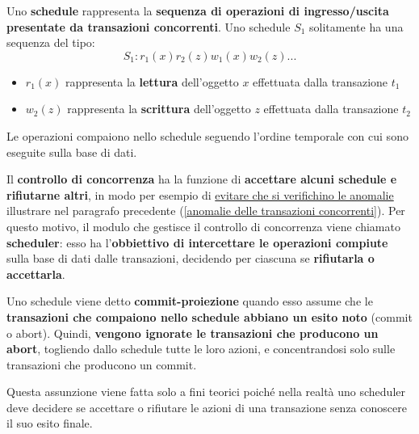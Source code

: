 \documentclass[a4paper]{article}
\begin{document}
	Uno \textcolor{Red3}{\textbf{schedule}} rappresenta la \textbf{sequenza di operazioni di ingresso/uscita presentate da transazioni concorrenti}. Uno schedule $S_{1}$ solitamente ha una sequenza del tipo:
	\begin{equation*}
		S_{1} : r_{1}\left(x\right) r_{2}\left(z\right) w_{1}\left(x\right) w_{2}\left(z\right) ...
	\end{equation*}
	\begin{itemize}
		\item $r_{1}\left(x\right)$ rappresenta la \textbf{lettura} dell'oggetto $x$ effettuata dalla transazione $t_{1}$
		\item $w_{2}\left(z\right)$ rappresenta la \textbf{scrittura} dell'oggetto $z$ effettuata dalla transazione $t_{2}$
	\end{itemize}
	Le operazioni compaiono nello schedule seguendo l'ordine temporale con cui sono eseguite sulla base di dati.\newline
	
	\noindent
	Il \textbf{controllo di concorrenza} ha la funzione di \textbf{accettare alcuni schedule e rifiutarne altri}, in modo per esempio di \underline{evitare che si verifichino le anomalie} illustrare nel paragrafo precedente (\ref{anomalie delle transazioni concorrenti}). Per questo motivo, il modulo che gestisce il controllo di concorrenza viene chiamato \textcolor{Red3}{\textbf{scheduler}}: esso ha l'\textbf{obbiettivo di intercettare le operazioni compiute} sulla base di dati dalle transazioni, decidendo per ciascuna se \textbf{rifiutarla o accettarla}.\newline
	
	\noindent
	Uno schedule viene detto \textcolor{Red3}{\textbf{commit-proiezione}} quando esso assume che le \textbf{transazioni che compaiono nello schedule abbiano un esito noto} (\textsf{commit} o \textsf{abort}). Quindi, \textbf{vengono ignorate le transazioni che producono un \textsf{abort}}, togliendo dallo schedule tutte le loro azioni, e concentrandosi solo sulle transazioni che producono un \textsf{commit}.
	
	Questa assunzione viene fatta solo a fini teorici poiché nella realtà uno scheduler deve decidere se accettare o rifiutare le azioni di una transazione senza conoscere il suo esito finale.\newline
	
\end{document}
